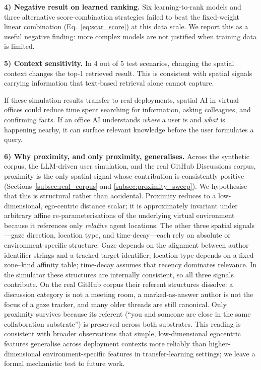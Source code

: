 \documentclass[journal]{IEEEtran}
\begin{document}
\textbf{4) Negative result on learned ranking.}
Six learning-to-rank models and three alternative score-combination strategies failed to beat the fixed-weight linear combination (Eq.~\ref{eq:scar_score}) at this data scale.
We report this as a useful negative finding: more complex models are not justified when training data is limited.

\textbf{5) Context sensitivity.}
In 4 out of 5 test scenarios, changing the spatial context changes the top-1 retrieved result.
This is consistent with spatial signals carrying information that text-based retrieval alone cannot capture.

If these simulation results transfer to real deployments,
spatial AI in virtual offices could reduce time spent searching for information, asking colleagues, and confirming facts.
If an office AI understands \emph{where} a user is and \emph{what} is happening nearby, it can surface relevant knowledge before the user formulates a query.

\textbf{6) Why proximity, and only proximity, generalises.}
Across the synthetic corpus, the LLM-driven user simulation, and the real
GitHub Discussions corpus, proximity is the only spatial signal whose
contribution is consistently positive (Sections~\ref{subsec:real_corpus} and
\ref{subsec:proximity_sweep}). We hypothesise that this is structural rather
than accidental. Proximity reduces to a low-dimensional, ego-centric
distance scalar; it is approximately invariant under arbitrary affine
re-parameterisations of the underlying virtual environment because it
references only \emph{relative} agent locations. The other three spatial
signals---gaze direction, location type, and time-decay---each rely on
absolute or environment-specific structure. Gaze depends on the alignment
between author identifier strings and a tracked target identifier; location
type depends on a fixed zone--kind affinity table; time-decay assumes that
recency dominates relevance. In the simulator these structures are
internally consistent, so all three signals contribute. On the real
GitHub corpus their referent structures dissolve: a discussion category is
not a meeting room, a marked-as-answer author is not the focus of a gaze
tracker, and many older threads are still canonical. Only proximity
survives because its referent (``you and someone are close in the same
collaboration substrate'') is preserved across both substrates. This
reading is consistent with broader observations that simple, low-dimensional
egocentric features generalise across deployment contexts more reliably
than higher-dimensional environment-specific features in transfer-learning
settings; we leave a formal mechanistic test to future work.
\end{document}
